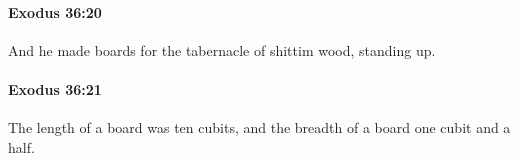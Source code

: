		\paragraph{Exodus 36:20} %
			\label{EXODUS-36-20}

			And he made boards for the tabernacle of shittim wood, standing up.


		\paragraph{Exodus 36:21} %
			\label{EXODUS-36-21}

			The length of a board was ten cubits, and the breadth of a board one cubit and a half.


